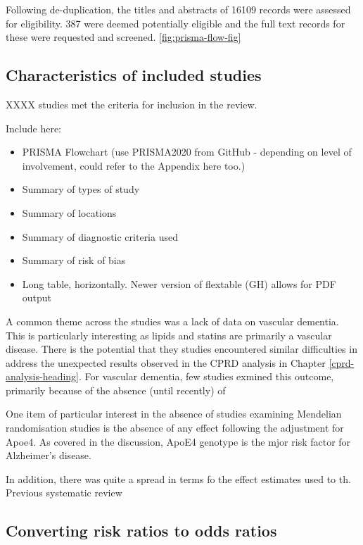 \documentclass[a4paper, twoside]{templates/ociamthesis}
\begin{document}
Following de-duplication, the titles and abstracts of 16109 records were assessed for eligibility. 387 were deemed potentially eligible and the full text records for these were requested and screened. \ref{fig:prisma-flow-fig}

\hypertarget{characteristics-of-included-studies}{%
\subsection{Characteristics of included studies}\label{characteristics-of-included-studies}}

XXXX studies met the criteria for inclusion in the review.

Include here:

\begin{itemize}
\item
  PRISMA Flowchart (use PRISMA2020 from GitHub - depending on level of involvement, could refer to the Appendix here too.)
\item
  Summary of types of study
\item
  Summary of locations
\item
  Summary of diagnostic criteria used
\item
  Summary of risk of bias
\item
  Long table, horizontally. Newer version of flextable (GH) allows for PDF output
\end{itemize}

A common theme across the studies was a lack of data on vascular dementia. This is particularly interesting as lipids and statins are primarily a vascular disease. There is the potential that they studies encountered similar difficulties in address the unexpected results observed in the CPRD analysis in Chapter \ref{cprd-analysis-heading}. For vascular dementia, few studies exmined this outcome, primarily because of the absence (until recently) of

One item of particular interest in the absence of studies examining Mendelian randomisation studies is the absence of any effect following the adjustment for Apoe4. As covered in the discussion, ApoE4 genotype is the mjor risk factor for Alzheimer's disease.

In addition, there was quite a spread in terms fo the effect estimates used to th. Previous systematic review

\hypertarget{converting-risk-ratios-to-odds-ratios}{%
\subsection{Converting risk ratios to odds ratios}\label{converting-risk-ratios-to-odds-ratios}}
\end{document}
